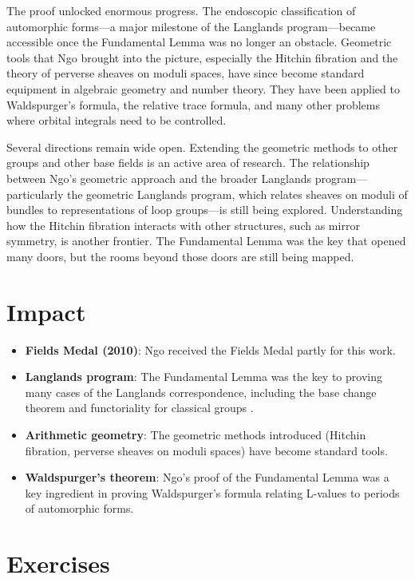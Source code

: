 The proof unlocked enormous progress. The endoscopic classification of automorphic forms---a major milestone of the Langlands program---became accessible once the Fundamental Lemma was no longer an obstacle. Geometric tools that Ngo brought into the picture, especially the Hitchin fibration and the theory of perverse sheaves on moduli spaces, have since become standard equipment in algebraic geometry and number theory. They have been applied to Waldspurger's formula, the relative trace formula, and many other problems where orbital integrals need to be controlled.

Several directions remain wide open. Extending the geometric methods to other groups and other base fields is an active area of research. The relationship between Ngo's geometric approach and the broader Langlands program---particularly the geometric Langlands program, which relates sheaves on moduli of bundles to representations of loop groups---is still being explored. Understanding how the Hitchin fibration interacts with other structures, such as mirror symmetry, is another frontier. The Fundamental Lemma was the key that opened many doors, but the rooms beyond those doors are still being mapped.

\section{Impact}

\begin{itemize}
\item \textbf{Fields Medal (2010)}: Ngo received the Fields Medal partly for this work.
\item \textbf{Langlands program}: The Fundamental Lemma was the key to proving many cases of the Langlands correspondence, including the base change theorem and functoriality for classical groups \cite{clozel2008}.
\item \textbf{Arithmetic geometry}: The geometric methods introduced (Hitchin fibration, perverse sheaves on moduli spaces) have become standard tools.
\item \textbf{Waldspurger's theorem}: Ngo's proof of the Fundamental Lemma was a key ingredient in proving Waldspurger's formula relating L-values to periods of automorphic forms.
\end{itemize}

\section{Exercises}

